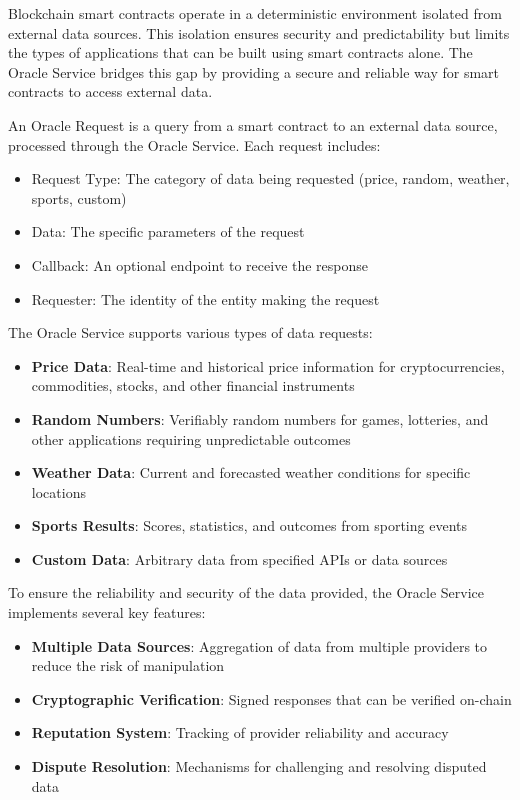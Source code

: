 Blockchain smart contracts operate in a deterministic environment isolated from external data sources. This isolation ensures security and predictability but limits the types of applications that can be built using smart contracts alone. The Oracle Service bridges this gap by providing a secure and reliable way for smart contracts to access external data.



\begin{definition}
An Oracle Request is a query from a smart contract to an external data source, processed through the Oracle Service. Each request includes:
\begin{itemize}
    \item Request Type: The category of data being requested (price, random, weather, sports, custom)
    \item Data: The specific parameters of the request
    \item Callback: An optional endpoint to receive the response
    \item Requester: The identity of the entity making the request
\end{itemize}
\end{definition}

The Oracle Service supports various types of data requests:

\begin{itemize}
    \item \textbf{Price Data}: Real-time and historical price information for cryptocurrencies, commodities, stocks, and other financial instruments
    \item \textbf{Random Numbers}: Verifiably random numbers for games, lotteries, and other applications requiring unpredictable outcomes
    \item \textbf{Weather Data}: Current and forecasted weather conditions for specific locations
    \item \textbf{Sports Results}: Scores, statistics, and outcomes from sporting events
    \item \textbf{Custom Data}: Arbitrary data from specified APIs or data sources
\end{itemize}

To ensure the reliability and security of the data provided, the Oracle Service implements several key features:

\begin{itemize}
    \item \textbf{Multiple Data Sources}: Aggregation of data from multiple providers to reduce the risk of manipulation
    \item \textbf{Cryptographic Verification}: Signed responses that can be verified on-chain
    \item \textbf{Reputation System}: Tracking of provider reliability and accuracy
    \item \textbf{Dispute Resolution}: Mechanisms for challenging and resolving disputed data
\end{itemize}

